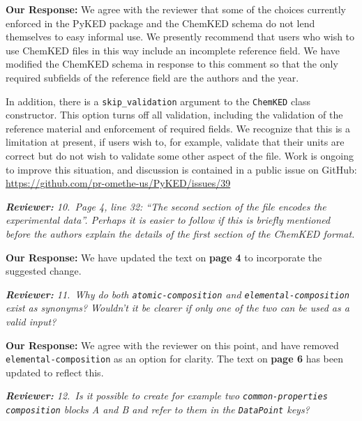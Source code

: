\documentclass[a4paper,10pt]{elsarticle}
\newenvironment{reviewer}{\vspace{0.5\baselineskip}\begingroup\itshape\textbf{Reviewer:}}{\endgroup}
\newenvironment{response}{\textbf{Our Response:}}{\vspace{0.5\baselineskip}}
\begin{document}
\begin{response}
    We agree with the reviewer that some of the choices currently enforced in the PyKED package and
    the ChemKED schema do not lend themselves to easy informal use. We presently recommend that
    users who wish to use ChemKED files in this way include an incomplete reference field. We have
    modified the ChemKED schema in response to this comment so that the only required subfields of
    the reference field are the authors and the year.

    In addition, there is a \verb|skip_validation| argument to the \verb|ChemKED| class constructor.
    This option turns off all validation, including the validation of the reference material
    and enforcement of required fields. We recognize that this is a limitation at present, if users
    wish to, for example, validate that their units are correct but do not wish to validate some
    other aspect of the file. Work is ongoing to improve this situation, and discussion is contained
    in a public issue on GitHub: \url{https://github.com/pr-omethe-us/PyKED/issues/39}
\end{response}

\begin{reviewer}
    10.~Page 4, line 32: ``The second section of the file encodes the experimental data''. Perhaps
    it is easier to follow if this is briefly mentioned before the authors explain the details of
    the first section of the ChemKED format.
\end{reviewer}

\begin{response}
    We have updated the text on \textbf{page 4} to incorporate the suggested change.
\end{response}

\begin{reviewer}
    11.~Why do both \texttt{atomic-composition} and \texttt{elemental-composition} exist as
    synonyms? Wouldn't it be clearer if only one of the two can be used as a valid input?
\end{reviewer}

\begin{response}
    We agree with the reviewer on this point, and have removed \texttt{elemental-composition}
    as an option for clarity. The text on \textbf{page 6} has been updated to reflect this.
\end{response}

\begin{reviewer}
    12.~Is it possible to create for example two \texttt{common-properties} \texttt{composition}
    blocks A and B and refer to them in the \texttt{DataPoint} keys?
\end{reviewer}
\end{document}
